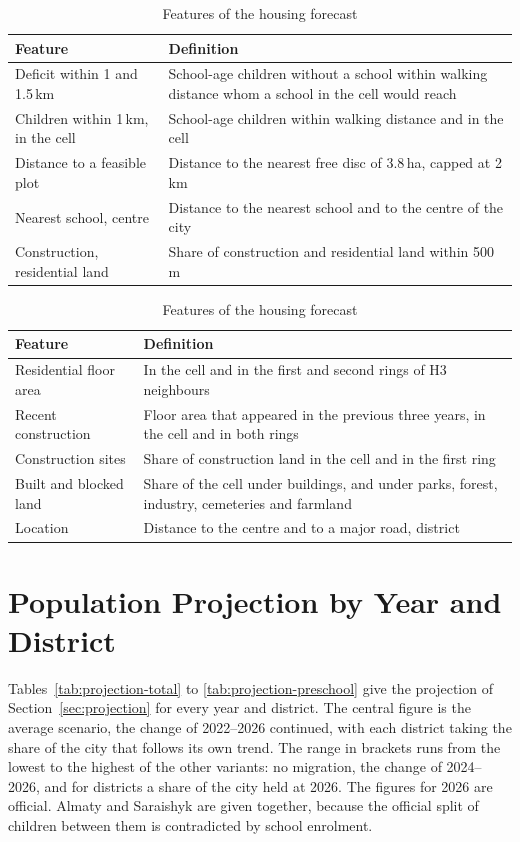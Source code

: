 \begin{table}[p]
\centering
\caption{Features of the siting model}
\small
\begin{tabularx}{\textwidth}{>{\raggedright\arraybackslash}p{4.5cm}X}
\toprule
Feature & Definition \\
\midrule
Deficit within 1 and 1.5\,km & School-age children without a school within walking distance whom a school in the cell would reach \\
Children within 1\,km, in the cell & School-age children within walking distance and in the cell \\
Distance to a feasible plot & Distance to the nearest free disc of 3.8\,ha, capped at 2\,km \\
Nearest school, centre & Distance to the nearest school and to the centre of the city \\
Construction, residential land & Share of construction and residential land within 500\,m \\
\bottomrule
\end{tabularx}

\vspace{1.2cm}
\caption{Features of the housing forecast}
\small
\begin{tabularx}{\textwidth}{>{\raggedright\arraybackslash}p{4.5cm}X}
\toprule
Feature & Definition \\
\midrule
Residential floor area & In the cell and in the first and second rings of H3 neighbours \\
Recent construction & Floor area that appeared in the previous three years, in the cell and in both rings \\
Construction sites & Share of construction land in the cell and in the first ring \\
Built and blocked land & Share of the cell under buildings, and under parks, forest, industry, cemeteries and farmland \\
Location & Distance to the centre and to a major road, district \\
\bottomrule
\end{tabularx}
\end{table}

\chapter{Population Projection by Year and District}
\label{app:projection}

Tables~\ref{tab:projection-total} to \ref{tab:projection-preschool} give the projection of Section~\ref{sec:projection} for every year and district. The central figure is the average scenario, the change of 2022--2026 continued, with each district taking the share of the city that follows its own trend. The range in brackets runs from the lowest to the highest of the other variants: no migration, the change of 2024--2026, and for districts a share of the city held at 2026. The figures for 2026 are official. Almaty and Saraishyk are given together, because the official split of children between them is contradicted by school enrolment.

